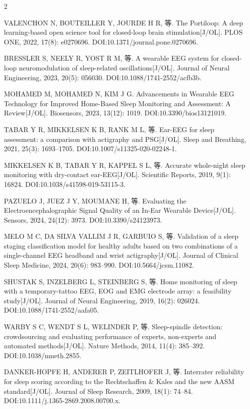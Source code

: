 \documentclass[UTF8,zihao=5,fontset=none]{ctexart}
\begin{document}
\begin{multicols}{2}
{\makebox[25.2pt][l]{[9]}VALENCHON N, BOUTEILLER Y, JOURDE H R, 等. The Portiloop: A deep learning-based open science tool for closed-loop brain stimulation[J/OL]. PLOS ONE, 2022, 17(8): e0270696. DOI:10.1371/journal.pone.0270696.\par
\makebox[25.2pt][l]{[10]}BRESSLER S, NEELY R, YOST R M, 等. A wearable EEG system for closed-loop neuromodulation of sleep-related oscillations[J/OL]. Journal of Neural Engineering, 2023, 20(5): 056030. DOI:10.1088/1741-2552/acfb3b.\par
\makebox[25.2pt][l]{[11]}MOHAMED M, MOHAMED N, KIM J G. Advancements in Wearable EEG Technology for Improved Home-Based Sleep Monitoring and Assessment: A Review[J/OL]. Biosensors, 2023, 13(12): 1019. DOI:10.3390/bios13121019.\par
\makebox[25.2pt][l]{[12]}TABAR Y R, MIKKELSEN K B, RANK M L, 等. Ear-EEG for sleep assessment: a comparison with actigraphy and PSG[J/OL]. Sleep and Breathing, 2021, 25(3): 1693--1705. DOI:10.1007/s11325-020-02248-1.\par
\makebox[25.2pt][l]{[13]}MIKKELSEN K B, TABAR Y R, KAPPEL S L, 等. Accurate whole-night sleep monitoring with dry-contact ear-EEG[J/OL]. Scientific Reports, 2019, 9(1): 16824. DOI:10.1038/s41598-019-53115-3.\par
\makebox[25.2pt][l]{[14]}PAZUELO J, JUEZ J Y, MOUMANE H, 等. Evaluating the Electroencephalographic Signal Quality of an In-Ear Wearable Device[J/OL]. Sensors, 2024, 24(12): 3973. DOI:10.3390/s24123973.\par
\makebox[25.2pt][l]{[15]}MELO M C, DA SILVA VALLIM J R, GARBUIO S, 等. Validation of a sleep staging classification model for healthy adults based on two combinations of a single-channel EEG headband and wrist actigraphy[J/OL]. Journal of Clinical Sleep Medicine, 2024, 20(6): 983--990. DOI:10.5664/jcsm.11082.\par
\makebox[25.2pt][l]{[16]}SHUSTAK S, INZELBERG L, STEINBERG S, 等. Home monitoring of sleep with a temporary-tattoo EEG, EOG and EMG electrode array: a feasibility study[J/OL]. Journal of Neural Engineering, 2019, 16(2): 026024. DOI:10.1088/1741-2552/aafa05.\par
\makebox[25.2pt][l]{[17]}WARBY S C, WENDT S L, WELINDER P, 等. Sleep-spindle detection: crowdsourcing and evaluating performance of experts, non-experts and automated methods[J/OL]. Nature Methods, 2014, 11(4): 385--392. DOI:10.1038/nmeth.2855.\par
\makebox[25.2pt][l]{[18]}DANKER-HOPFE H, ANDERER P, ZEITLHOFER J, 等. Interrater reliability for sleep scoring according to the Rechtschaffen \& Kales and the new AASM standard[J/OL]. Journal of Sleep Research, 2009, 18(1): 74--84. DOI:10.1111/j.1365-2869.2008.00700.x.\par
}
\end{multicols}
\end{document}
